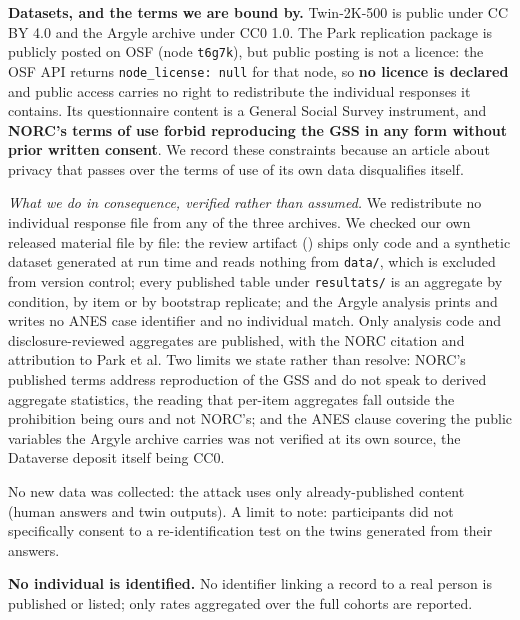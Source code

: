 \documentclass[sigconf,anonymous,review]{acmart}
\begin{document}
\begin{ethics}

\textbf{Datasets, and the terms we are bound by.} Twin-2K-500 is public under CC BY 4.0 and the Argyle archive under CC0 1.0. The Park replication package is publicly posted on OSF (node \texttt{t6g7k}), but public posting is not a licence: the OSF API returns \texttt{node\_\allowbreak{}license: null} for that node, so \textbf{no licence is declared} and public access carries no right to redistribute the individual responses it contains. Its questionnaire content is a General Social Survey instrument, and \textbf{NORC's terms of use forbid reproducing the GSS in any form without prior written consent}. We record these constraints because an article about privacy that passes over the terms of use of its own data disqualifies itself.

\textit{What we do in consequence, verified rather than assumed.} We redistribute no individual response file from any of the three archives. We checked our own released material file by file: the review artifact (\osname{}) ships only code and a synthetic dataset generated at run time and reads nothing from \texttt{data/\allowbreak{}}, which is excluded from version control; every published table under \texttt{resultats/\allowbreak{}} is an aggregate by condition, by item or by bootstrap replicate; and the Argyle analysis prints and writes no ANES case identifier and no individual match. Only analysis code and disclosure-reviewed aggregates are published, with the NORC citation and attribution to Park et al. Two limits we state rather than resolve: NORC's published terms address reproduction of the GSS and do not speak to derived aggregate statistics, the reading that per-item aggregates fall outside the prohibition being ours and not NORC's; and the ANES clause covering the public variables the Argyle archive carries was not verified at its own source, the Dataverse deposit itself being CC0.

No new data was collected: the attack uses only already-published content (human answers and twin outputs). A limit to note: participants did not specifically consent to a re-identification test on the twins generated from their answers.

\textbf{No individual is identified.} No identifier linking a record to a real person is published or listed; only rates aggregated over the full cohorts are reported.


\end{ethics}
\end{document}
